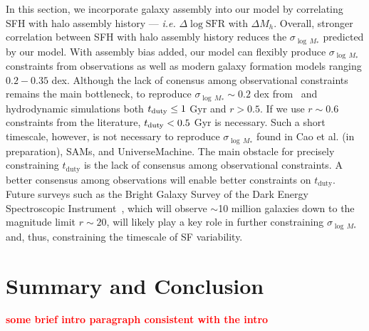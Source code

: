 \documentclass[12pt, letterpaper, preprint, tighten]{aastex62}
\newcommand{\todo}[1]{{\bf \textcolor{red}{#1}}}
\newcommand{\logsfr}{\log\mathrm{SFR}}
\begin{document}
In this section, we incorporate galaxy assembly into our model by correlating 
SFH with halo assembly history --- \emph{i.e.} $\Delta\logsfr$ with $\Delta M_h$. 
Overall, stronger correlation between SFH with halo assembly history reduces
the $\sigma_{\log\,M_*}$ predicted by our model. With assembly bias added, our 
model can flexibly produce $\sigma_{\log\,M_*}$ constraints from observations 
as well as modern galaxy formation models ranging $0.2 - 0.35$ dex. Although 
the lack of conensus among observational constraints remains the main bottleneck, 
to reproduce $\sigma_{\log\,M_*}\sim 0.2$ dex from~\cite{more2011, leauthaud2012, reddick2013, tinker2013, zu2015} 
and hydrodynamic simulations both $t_{\rm duty} \leq 1$ Gyr and $r > 0.5$. If
we use $r\sim0.6$ constraints from the literature, $t_{\rm duty} < 0.5$ Gyr is 
necessary. Such a short timescale, however, is not necessary to reproduce 
$\sigma_{\log\,M_*}$ found in Cao et al. (in preparation), SAMs, and 
{\sc UniverseMachine}. The main obstacle for precisely constraining $t_\mathrm{duty}$ 
is the lack of consensus among observational constraints. A better consensus among
observations will enable better constraints on $t_\mathrm{duty}$. Future surveys 
such as the Bright Galaxy Survey of the Dark Energy Spectroscopic Instrument~\citep[DESI;][]{desicollaboration2016}, 
which will observe $\sim$10 million galaxies down to the magnitude limit 
$r \sim 20$, will likely play a key role in further constraining $\sigma_{\log\,M_*}$ 
and, thus, constraining the timescale of SF variability.


\section{Summary and Conclusion} \label{sec:summary}
\todo{some brief intro paragraph consistent with the intro} 
\end{document}
